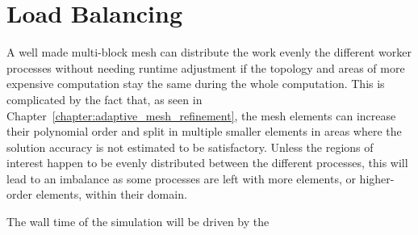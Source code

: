 \chapter{Load Balancing} \label{chapter:load_balancing} 

A well made multi-block mesh can distribute the work evenly the different worker processes without
needing runtime adjustment if the topology and areas of more expensive computation stay the same
during the whole computation. This is complicated by the fact that, as seen in
Chapter~\ref{chapter:adaptive_mesh_refinement}, the mesh elements can increase their polynomial
order and split in multiple smaller elements in areas where the solution accuracy is not estimated
to be satisfactory. Unless the regions of interest happen to be evenly distributed between the
different processes, this will lead to an imbalance as some processes are left with more elements,
or higher-order elements, within their domain.

The wall time of the simulation will be driven by the 